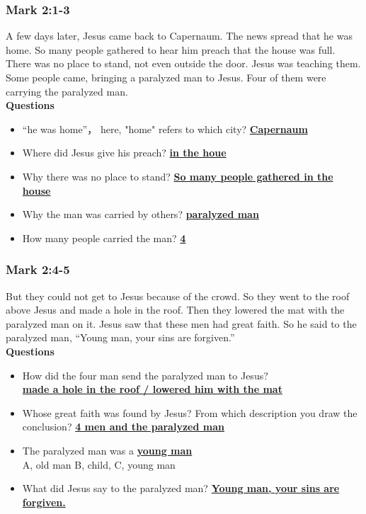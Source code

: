 \subsubsection{\large{Mark 2:1-3}}
A few days later, Jesus came back to Capernaum. The news spread that he was home. So many people gathered to hear him preach that the house was full. There was no place to stand, not even outside the door. Jesus was teaching them. Some people came, bringing a paralyzed man to Jesus. Four of them were carrying the paralyzed man. \\
\vspace{.25cm}
\textbf{Questions}\vspace{-.5cm}
\begin{itemize}[noitemsep]
\item “he was home”， here, "home" refers to which city? \textbf{\underline{Capernaum}}
\item Where did Jesus give his preach? \textbf{\underline{in the houe}}
\item Why there was no place to stand? \textbf{\underline{So many people gathered in the house}}
\item Why the man was carried by others? \textbf{\underline{paralyzed man}}
\item How many people carried the man? \textbf{\underline{4}}
\end{itemize}

\vspace{.25cm}
\subsubsection{\large{Mark 2:4-5}}
But they could not get to Jesus because of the crowd. So they went to the roof above Jesus and made a hole in the roof. Then they lowered the mat with the paralyzed man on it. Jesus saw that these men had great faith. So he said to the paralyzed man, “Young man, your sins are forgiven.” \\
\vspace{.25cm}
\textbf{Questions}\vspace{-.5cm}
\begin{itemize}[noitemsep]
\item How did the four man send the paralyzed man to Jesus?\\  \textbf{\underline{made a hole in the roof / lowered him with the mat}}
\item Whose great faith was found by Jesus? From which description you draw the conclusion?  \textbf{\underline{4 men and the paralyzed man }}
\item The paralyzed man was a \textbf{\underline{ young man}}\\
A, old man \hspace{1cm} B, child, \hspace{1cm} C, young man
\item What did Jesus say to the paralyzed man? \textbf{\underline{Young man, your sins are forgiven.}}
\end{itemize}

